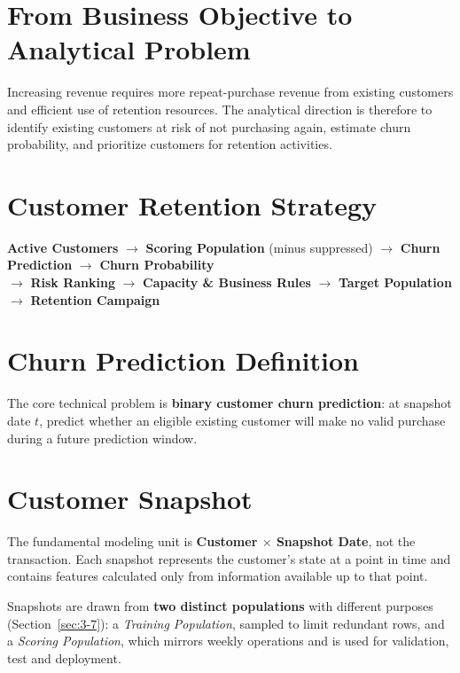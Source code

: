 \section{From Business Objective to Analytical Problem}
\label{sec:3-1}

Increasing revenue requires more repeat-purchase revenue from existing customers and efficient use of retention resources. The analytical direction is therefore to identify existing customers at risk of not purchasing again, estimate churn probability, and prioritize customers for retention activities.

\section{Customer Retention Strategy}
\label{sec:3-2}

\begin{center}
\textbf{Active Customers} $\rightarrow$ \textbf{Scoring Population} (minus suppressed) $\rightarrow$ \textbf{Churn Prediction} $\rightarrow$ \textbf{Churn Probability} \\[0.3cm]
$\rightarrow$ \textbf{Risk Ranking} $\rightarrow$ \textbf{Capacity \& Business Rules} $\rightarrow$ \textbf{Target Population} $\rightarrow$ \textbf{Retention Campaign}
\end{center}

\section{Churn Prediction Definition}
\label{sec:3-3}

The core technical problem is \textbf{binary customer churn prediction}: at snapshot date $t$, predict whether an eligible existing customer will make no valid purchase during a future prediction window.

\section{Customer Snapshot}
\label{sec:3-4}

The fundamental modeling unit is \textbf{Customer $\times$ Snapshot Date}, not the transaction. Each snapshot represents the customer's state at a point in time and contains features calculated only from information available up to that point.

Snapshots are drawn from \textbf{two distinct populations} with different purposes (Section~\ref{sec:3-7}): a \emph{Training Population}, sampled to limit redundant rows, and a \emph{Scoring Population}, which mirrors weekly operations and is used for validation, test and deployment.

